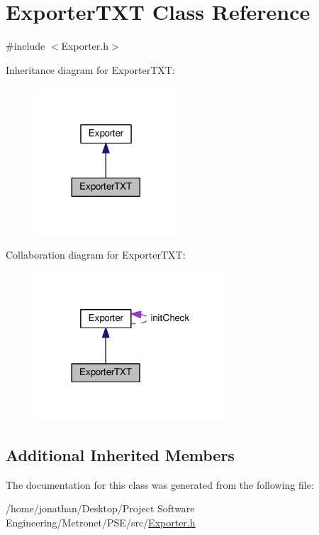 \hypertarget{class_exporter_t_x_t}{}\section{Exporter\+T\+XT Class Reference}
\label{class_exporter_t_x_t}


{\ttfamily \#include $<$Exporter.\+h$>$}



Inheritance diagram for Exporter\+T\+XT\+:
\nopagebreak
\begin{figure}[H]
\begin{center}
\leavevmode
\includegraphics[width=152pt]{class_exporter_t_x_t__inherit__graph}
\end{center}
\end{figure}


Collaboration diagram for Exporter\+T\+XT\+:
\nopagebreak
\begin{figure}[H]
\begin{center}
\leavevmode
\includegraphics[width=206pt]{class_exporter_t_x_t__coll__graph}
\end{center}
\end{figure}
\subsection*{Additional Inherited Members}


The documentation for this class was generated from the following file\+:\begin{DoxyCompactItemize}
\item 
/home/jonathan/\+Desktop/\+Project Software Engineering/\+Metronet/\+P\+S\+E/src/\hyperlink{_exporter_8h}{Exporter.\+h}\end{DoxyCompactItemize}

